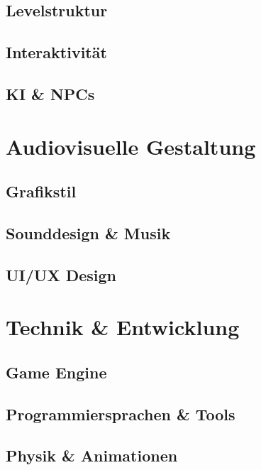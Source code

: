 \documentclass[11pt, a4paper]{article} %
\begin{document}
\subsection{Levelstruktur}
\subsection{Interaktivität}
\subsection{KI \& NPCs}

\newpage

\section{Audiovisuelle Gestaltung}
\subsection{Grafikstil}
\subsection{Sounddesign \& Musik}
\subsection{UI/UX Design}

\newpage

\section{Technik \& Entwicklung}
\subsection{Game Engine}
\subsection{Programmiersprachen \& Tools}
\subsection{Physik \& Animationen}
\end{document}
